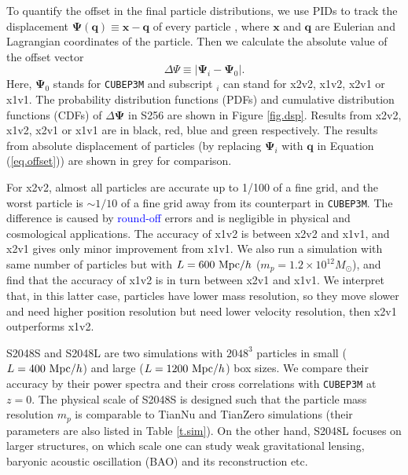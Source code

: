 \documentclass[10pt,twocolumn,preprint]{emulateapj}
\newcommand{\bs}{\boldsymbol}
\newcommand{\Msun}{M_\odot}
\newcommand{\tcb}{\textcolor{blue}}
\begin{document}
To quantify the offset in the final particle distributions, we use PIDs to track the displacement ${\bs \Psi}({\bs q})\equiv{\bs x}-{\bs q}$ of every particle \citep{2017PhRvD..95d3501Y}, where ${\bs x}$ and ${\bs q}$ are Eulerian and Lagrangian coordinates of the particle. Then we calculate the absolute value of the offset vector
\begin{equation}\label{eq.offset}
	\Delta\Psi\equiv|{\bs\Psi}_i-{\bs\Psi}_0|.
\end{equation}
Here, ${\bs\Psi}_0$ stands for {\tt CUBEP3M} and subscript $_i$ can stand for x2v2, x1v2, x2v1 or x1v1. The probability distribution functions (PDFs) and cumulative distribution functions (CDFs) of $\Delta\bs\Psi$ in S256 are shown in Figure \ref{fig.dsp}. Results from x2v2, x1v2, x2v1 or x1v1 are in black, red, blue and green respectively. The results from absolute displacement of particles (by replacing ${\bs\Psi}_i$ with ${\bs q}$ in Equation (\ref{eq.offset})) are shown in grey for comparison.

For x2v2, almost all particles are accurate up to 1/100 of a fine grid, and the worst particle is $\sim 1/10$ of a fine grid away from its counterpart in {\tt CUBEP3M}. The difference is caused by \tcb{round-off} errors and is negligible in physical and cosmological applications. The accuracy of x1v2 is between x2v2 and x1v1, and x2v1 gives only minor improvement from x1v1. We also run a simulation with same number of particles but with $L=600\ {\rm Mpc}/h$ ($m_p=1.2\times 10^{12}\Msun$), and find that the accuracy of x1v2 is in turn between x2v1 and x1v1. We interpret that, in this latter case, particles have lower mass resolution, so they move slower and need higher position resolution but need lower velocity resolution, then x2v1 outperforms x1v2.

S2048S and S2048L are two simulations with $2048^3$ particles in small ($L=400\ {\rm Mpc}/h$) and large ($L=1200\ {\rm Mpc}/h$) box sizes. We compare their accuracy by their power spectra and their cross correlations with {\tt CUBEP3M} at $z=0$. The physical scale of S2048S is designed such that the particle mass resolution $m_p$ is comparable to TianNu and TianZero simulations (their parameters are also listed in Table \ref{t.sim}). On the other hand, S2048L focuses on larger structures, on which scale one can study weak gravitational lensing, baryonic acoustic oscillation (BAO) \citep{2005ApJ...633..560E} and its reconstruction \citep{2007ApJ...664..675E,2017ApJ...841L..29W} etc.
\end{document}
